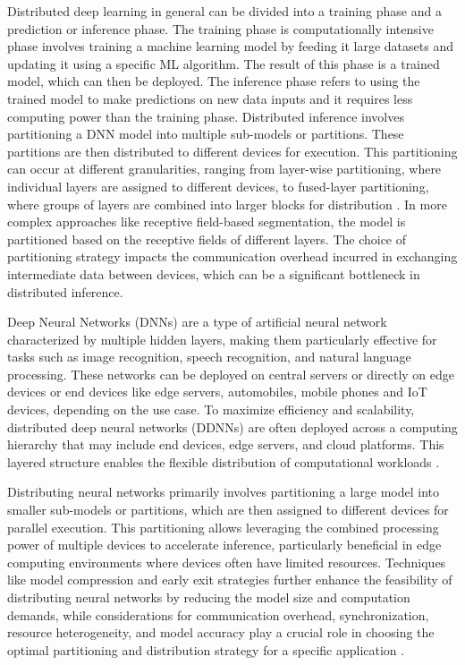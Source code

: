 \documentclass[conference]{IEEEtran}
\begin{document}
Distributed deep learning in general can be divided into a training phase and a prediction or inference phase. The training phase is computationally intensive phase involves training a machine learning model by feeding it large datasets and updating it using a specific ML algorithm. The result of this phase is a trained model, which can then be deployed. The inference phase refers to using the trained model to make predictions on new data inputs and it requires less computing power than the training phase. Distributed inference involves partitioning a DNN model into multiple sub-models or partitions. These partitions are then distributed to different devices for execution. This partitioning can occur at different granularities, ranging from layer-wise partitioning, where individual layers are assigned to different devices, to fused-layer partitioning, where groups of layers are combined into larger blocks for distribution \cite{hou2022distredge, zhao2018deepthings}. In more complex approaches like receptive field-based segmentation, the model is partitioned based on the receptive fields of different layers. The choice of partitioning strategy impacts the communication overhead incurred in exchanging intermediate data between devices, which can be a significant bottleneck in distributed inference.

Deep Neural Networks (DNNs) are a type of artificial neural network characterized by multiple hidden layers, making them particularly effective for tasks such as image recognition, speech recognition, and natural language processing. These networks can be deployed on central servers or directly on edge devices or end devices like edge servers, automobiles, mobile phones and IoT devices, depending on the use case. To maximize efficiency and scalability, distributed deep neural networks (DDNNs) are often deployed across a computing hierarchy that may include end devices, edge servers, and cloud platforms. This layered structure enables the flexible distribution of computational workloads \cite{chinchali2018neural, teerapittayanon2017distributed}.

Distributing neural networks primarily involves partitioning a large model into smaller sub-models or partitions, which are then assigned to different devices for parallel execution. This partitioning allows leveraging the combined processing power of multiple devices to accelerate inference, particularly beneficial in edge computing environments where devices often have limited resources. Techniques like model compression and early exit strategies further enhance the feasibility of distributing neural networks by reducing the model size and computation demands, while considerations for communication overhead, synchronization, resource heterogeneity, and model accuracy play a crucial role in choosing the optimal partitioning and distribution strategy for a specific application \cite{zhao2018deepthings}.
\end{document}
